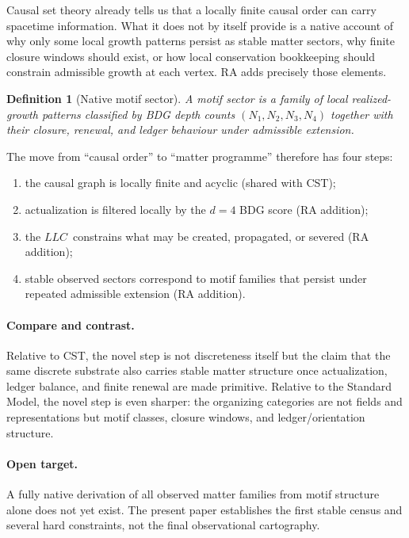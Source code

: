 \documentclass[11pt]{article}
\def\mathrm#1{#1}%
\newtheorem{definition}{Definition}
\newcommand{\LLC}{\ensuremath{\mathrm{LLC}}}
\begin{document}
Causal set theory already tells us that a locally finite causal order can carry spacetime information. What it does not by itself provide is a native account of why only some local growth patterns persist as stable matter sectors, why finite closure windows should exist, or how local conservation bookkeeping should constrain admissible growth at each vertex. RA adds precisely those elements.

\begin{definition}[Native motif sector]
A \emph{motif sector} is a family of local realized-growth patterns classified by BDG depth counts $(N_1,N_2,N_3,N_4)$ together with their closure, renewal, and ledger behaviour under admissible extension.
\end{definition}

The move from ``causal order'' to ``matter programme'' therefore has four steps:
\begin{enumerate}[nosep]
    \item the causal graph is locally finite and acyclic (shared with CST);
    \item actualization is filtered locally by the $d=4$ BDG score (RA addition);
    \item the \LLC\ constrains what may be created, propagated, or severed (RA addition);
    \item stable observed sectors correspond to motif families that persist under repeated admissible extension (RA addition).
\end{enumerate}

\paragraph{Compare and contrast.} Relative to CST, the novel step is not discreteness itself but the claim that the same discrete substrate also carries stable matter structure once actualization, ledger balance, and finite renewal are made primitive. Relative to the Standard Model, the novel step is even sharper: the organizing categories are not fields and representations but motif classes, closure windows, and ledger/orientation structure.

\paragraph{Open target.} A fully native derivation of all observed matter families from motif structure alone does not yet exist. The present paper establishes the first stable census and several hard constraints, not the final observational cartography.
\end{document}
